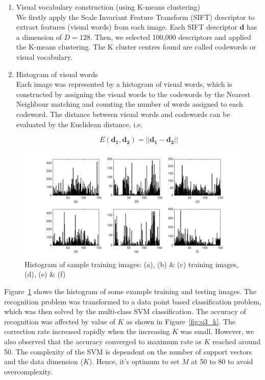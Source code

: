 \documentclass[10pt,twocolumn,letterpaper]{article}
\begin{document}
\begin{enumerate}
 \item Visual vocabulary construction (using K-means clustering)\\
 We firstly apply the Scale Invariant Feature Transform (SIFT) descriptor to extract features (visual words) from each image. Each SIFT descriptor $\boldsymbol{d}$ has a dimension of $D = 128$. Then, we selected 100,000 descriptors and applied the K-means clustering. The K cluster centres found are called codewords or visual vocabulary.

\item Histogram of visual words\\
Each image was represented by a histogram of visual words, which is constructed by assigning the visual words to the codewords by the Nearest Neighbour matching and counting the number of words assigned to each codeword. The distance between visual words and codewords can be evaluated by the Euclidean distance, i.e.

\begin{equation}
 E(\boldsymbol{d_1}, \boldsymbol{d_2}) = || \boldsymbol{d_1} - \boldsymbol{d_2}||
\end{equation}
\end{enumerate}


\begin{figure}
	\begin{center}
		\includegraphics[width=1\linewidth]{q3_hist}
		\caption{Histogram of sample training images: (a), (b) \& (c) training images, (d), (e) \& (f)}
		\label{fig:q3_hist}
	\end{center}
\end{figure}



Figure~\ref{fig:q3_hist} shows the histogram of some example training and testing images. The recognition problem was transformed to a data point based classification problem, which was then solved by the multi-class SVM classification. The accuracy of recognition was affected by value of $K$ as shown in Figure~\ref{fig:q3_k}. The correction rate increased rapidly when the increasing $K$ was small. However, we also observed that the accuracy converged to maximum rate as $K$ reached around 50. The complexity of the SVM is dependent on the number of support vectors and the data dimension ($K$). Hence, it's optimum to set $M$ at 50 to 80 to avoid overcomplexity. 
\end{document}
